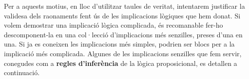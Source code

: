 Per a aquests motius, en lloc d'utilitzar taules de veritat, intentarem
justificar la validesa dels raonaments fent ús de les implicacions lògiques que hem donat. Si volem demostrar una implicació lògica
complicada, és recomanable fer-ho descomponent-la en una
col·lecció d'implicacions més senzilles, preses
d'una en una. Si ja es coneixen les implicacions més simples, podrien
ser blocs per a la implicació més complicada. Algunes de les
implicacions senzilles que fem servir, conegudes com a \textbf{regles d'inferència} \label{sec:lleis-inferencia} de la lògica proposicional, es detallen a continuació.

\bigskip

\begin{center}
\end{center}
